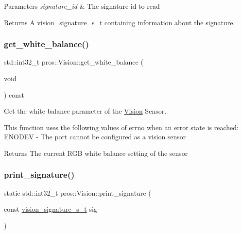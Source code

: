 \begin{DoxyParams}{Parameters}
{\em signature\+\_\+id} & The signature id to read\\
\hline
\end{DoxyParams}
\begin{DoxyReturn}{Returns}
A vision\+\_\+signature\+\_\+s\+\_\+t containing information about the signature. 
\end{DoxyReturn}
\mbox{\label{classpros_1_1Vision_a7a89ad6812bfd46e24e69e1dc2f55039}} 
\subsubsection{\texorpdfstring{get\+\_\+white\+\_\+balance()}{get\_white\_balance()}}
{\footnotesize\ttfamily std\+::int32\+\_\+t pros\+::\+Vision\+::get\+\_\+white\+\_\+balance (\begin{DoxyParamCaption}\item[{void}]{ }\end{DoxyParamCaption}) const}



Get the white balance parameter of the \hyperlink{classpros_1_1Vision}{Vision} Sensor. 

This function uses the following values of errno when an error state is reached\+: E\+N\+O\+D\+EV -\/ The port cannot be configured as a vision sensor

\begin{DoxyReturn}{Returns}
The current R\+GB white balance setting of the sensor 
\end{DoxyReturn}
\mbox{\label{classpros_1_1Vision_ada22311366ce088fa9ac08a8e3510800}} 
\subsubsection{\texorpdfstring{print\+\_\+signature()}{print\_signature()}}
{\footnotesize\ttfamily static std\+::int32\+\_\+t pros\+::\+Vision\+::print\+\_\+signature (\begin{DoxyParamCaption}\item[{const \hyperlink{vision_8h_a135c729c7277f6cc019c2924088a5fd5}{vision\+\_\+signature\+\_\+s\+\_\+t}}]{sig }\end{DoxyParamCaption})\hspace{0.3cm}{\ttfamily [static]}}



